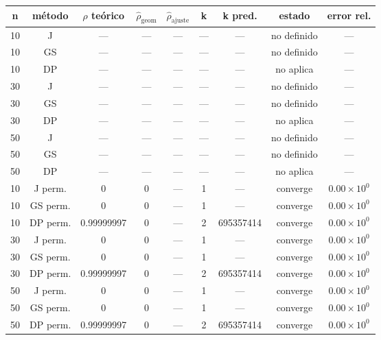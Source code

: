 {\scriptsize
\begin{tabular}{ccccccccc}
\toprule
\rowcolor{Azul1!50}
n & método & $\rho$ teórico & $\hat\rho_{\mathrm{geom}}$ & $\hat\rho_{\mathrm{ajuste}}$ & k & k pred. & estado & error rel. \\
\midrule
10 & J & --- & --- & --- & --- & --- & no definido & --- \\
10 & GS & --- & --- & --- & --- & --- & no definido & --- \\
10 & DP & --- & --- & --- & --- & --- & no aplica & --- \\
30 & J & --- & --- & --- & --- & --- & no definido & --- \\
30 & GS & --- & --- & --- & --- & --- & no definido & --- \\
30 & DP & --- & --- & --- & --- & --- & no aplica & --- \\
50 & J & --- & --- & --- & --- & --- & no definido & --- \\
50 & GS & --- & --- & --- & --- & --- & no definido & --- \\
50 & DP & --- & --- & --- & --- & --- & no aplica & --- \\
10 & J perm. & 0 & 0 & --- & 1 & --- & converge & $0.00\times10^{0}$ \\
10 & GS perm. & 0 & 0 & --- & 1 & --- & converge & $0.00\times10^{0}$ \\
10 & DP perm. & 0.99999997 & 0 & --- & 2 & 695357414 & converge & $0.00\times10^{0}$ \\
30 & J perm. & 0 & 0 & --- & 1 & --- & converge & $0.00\times10^{0}$ \\
30 & GS perm. & 0 & 0 & --- & 1 & --- & converge & $0.00\times10^{0}$ \\
30 & DP perm. & 0.99999997 & 0 & --- & 2 & 695357414 & converge & $0.00\times10^{0}$ \\
50 & J perm. & 0 & 0 & --- & 1 & --- & converge & $0.00\times10^{0}$ \\
50 & GS perm. & 0 & 0 & --- & 1 & --- & converge & $0.00\times10^{0}$ \\
50 & DP perm. & 0.99999997 & 0 & --- & 2 & 695357414 & converge & $0.00\times10^{0}$ \\
\bottomrule
\end{tabular}}
